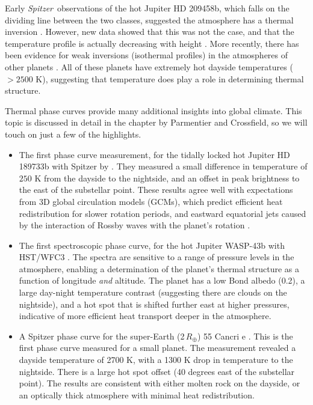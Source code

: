 \documentclass[graybox,natbib,nosecnum]{svmult}
\newcommand{\hbindex}[1]{\hl{#1}\index{#1}}  %
\newcommand{\project}[1]{\textsl{#1}}
\newcommand{\Spitzer}{\project{Spitzer}}
\begin{document}
Early \Spitzer\ observations of the hot Jupiter HD 209458b, which falls on the dividing line between the two classes, suggested the atmosphere has a thermal inversion \citep{knutson08}. 
However, new data showed that this was not the case, and that the temperature profile is actually decreasing with height \citep{diamond-lowe14, schwarz15, line16}.  More recently, there has been evidence for weak inversions (isothermal profiles) in the atmospheres of other planets \citep{stevenson14, haynes15}. All of these planets have extremely hot dayside temperatures ($> 2500$ K), suggesting that temperature does play a role in determining thermal structure. %

Thermal phase curves provide many additional insights into global climate. This topic is discussed in detail in the chapter by Parmentier and Crossfield, so we will touch on just a few of the highlights. 
\begin{itemize}
\item{The first phase curve measurement, for the tidally locked hot Jupiter HD 189733b with Spitzer by \cite{knutson07}. They measured a small difference in temperature of $250$ K from the dayside to the nightside, and an offset in peak brightness to the east of the substellar point. These results agree well with expectations from 3D global circulation models (GCMs), which predict efficient heat redistribution for slower rotation periods, and eastward equatorial jets caused by the interaction of Rossby waves with the planet's rotation \citep{showman09}.}
\item{The first spectroscopic phase curve, for the hot Jupiter WASP-43b with HST/WFC3 \citep{stevenson14}. The spectra are sensitive to a range of pressure levels in the atmosphere, enabling a determination of the planet's thermal structure as a function of longitude \emph{and} altitude. The planet has a low Bond albedo (0.2), a large day-night temperature contrast (suggesting there are clouds on the nightside), and a hot spot that is shifted further east at higher pressures, indicative of more efficient heat transport deeper in the atmosphere.}
\item{A Spitzer phase curve for the super-Earth (2\,$R_\oplus$) 55 Cancri e \citep{demory16}.  This is the first phase curve measured for a small planet.  The measurement revealed a dayside temperature of 2700 K, with a 1300 K drop in temperature to the nightside. There is a large hot spot offset (40 degrees east of the substellar point).  The results are consistent with either molten rock on the dayside, or an optically thick atmosphere with minimal heat redistribution.}
\end{itemize}
\end{document}
